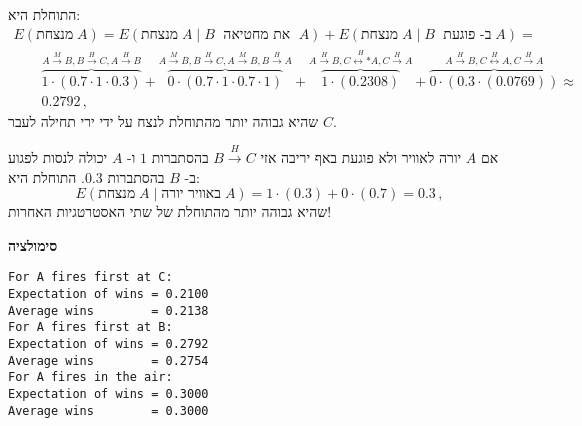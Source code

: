 התוחלת היא:
\vspace*{-4ex}
\[
\renewcommand*{\arraystretch}{2.5}
\begin{array}{l}
E(\textrm{מנצחת}\;A) =E(\textrm{מנצחת}\;A\;|\;B\;\textrm{ את מחטיאה }\;A) + E(\textrm{מנצחת}\;A\;|\;B\;\textrm{ ב- פוגעת}\;A)=\\
\qquad
\overbrace{1\cdot (0.7\cdot 1\cdot 0.3)}%
^{A\stackrel{M}{\longrightarrow}B, B\stackrel{H}{\longrightarrow}C, A\stackrel{H}{\longrightarrow}B}+

\overbrace{0\cdot (0.7\cdot 1\cdot 0.7\cdot 1)}%
^{A\stackrel{M}{\longrightarrow}B, B\stackrel{H}{\longrightarrow}C,A\stackrel{M}{\longrightarrow}B,B\stackrel{H}{\longrightarrow}A} +

\overbrace{1\cdot (0.2308)}%
^{A\stackrel{H}{\longrightarrow}B, C\stackrel{H}{\longleftrightarrow*}A,C\stackrel{H}{\longrightarrow}A} +
\overbrace{0\cdot (0.3\cdot (0.0769))}%
^{A\stackrel{H}{\longrightarrow}B, C\stackrel{H}{\longleftrightarrow}A,C\stackrel{H}{\longrightarrow}A}
\approx\\
\qquad 0.2792\,,
\end{array}
\]
שהיא גבוהה יותר מהתוחלת לנצח על ידי ירי תחילה לעבר 
$C$.

אם
$A$
יורה לאוויר ולא פוגעת באף יריבה אזי
$B\stackrel{H}{\longrightarrow}C$
בהסתברות 
$1$
ו-%
$A$
יכולה לנסות לפגוע ב-%
$B$
בהסתברות
$0.3$.
התוחלת היא:
\[
E(\textrm{מנצחת}\;A\;|\;\textrm{באוויר יורה}\;A) = 1\cdot(0.3) + 0\cdot(0.7)=0.3\,,
\]
שהיא גבוהה יותר מהתוחלת של שתי האסטרטגיות האחרות!

\textbf{סימולציה}
\begin{verbatim}
For A fires first at C:
Expectation of wins = 0.2100
Average wins        = 0.2138
For A fires first at B:
Expectation of wins = 0.2792
Average wins        = 0.2754
For A fires in the air:
Expectation of wins = 0.3000
Average wins        = 0.3000
\end{verbatim}

